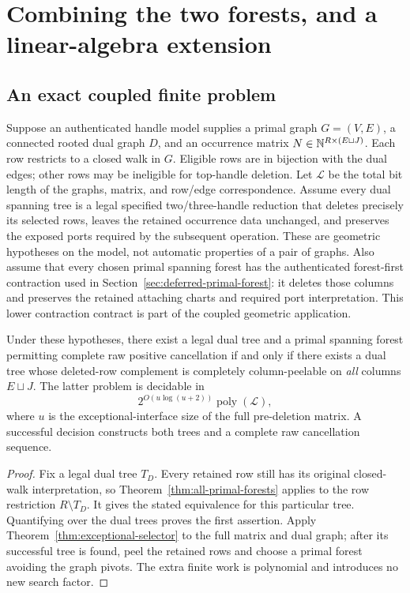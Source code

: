 \section{Combining the two forests, and a linear-algebra extension}
\label{sec:combination}

\subsection{An exact coupled finite problem}

Suppose an authenticated handle model supplies a primal graph $G=(V,E)$,
a connected rooted dual graph $D$, and an occurrence matrix
$N\in\mathbb N^{R\times(E\sqcup J)}$.  Each row restricts to a closed walk in
$G$.  Eligible rows are in bijection with the dual edges; other rows may
be ineligible for top-handle deletion.  Let $\mathcal L$ be the total bit
length of the graphs, matrix, and row/edge correspondence.
Assume every dual spanning tree is a legal specified
two/three-handle reduction that deletes precisely its selected rows,
leaves the retained occurrence data unchanged, and preserves the exposed
ports required by the subsequent operation.  These are geometric
hypotheses on the model, not automatic properties of a pair of graphs.
Also assume that every chosen primal spanning forest has the authenticated
forest-first contraction used in Section~\ref{sec:deferred-primal-forest}:
it deletes those columns and preserves the retained attaching charts and
required port interpretation.  This lower contraction contract is part
of the coupled geometric application.

\begin{corollary}
\label{cor:coupled-forests}
Under these hypotheses, there exist a legal dual tree and a primal
spanning forest permitting complete raw positive cancellation if and
only if there exists a dual tree whose deleted-row complement is
completely column-peelable on \emph{all} columns $E\sqcup J$.
The latter problem is decidable in
\[
 2^{O(u\log(u+2))}\operatorname{poly}(\mathcal L),
\]
where $u$ is the exceptional-interface size of the full pre-deletion
matrix.  A successful decision constructs both trees and a complete
raw cancellation sequence.
\end{corollary}
\begin{proof}
Fix a legal dual tree $T_D$.  Every retained row still has its original
closed-walk interpretation, so Theorem~\ref{thm:all-primal-forests} applies
to the row restriction $R\setminus T_D$.  It gives the stated equivalence
for this particular tree.  Quantifying over the dual trees proves the
first assertion.  Apply Theorem~\ref{thm:exceptional-selector} to the full
matrix and dual graph; after its successful tree is found, peel the
retained rows and choose a primal forest avoiding the graph pivots.
The extra finite work is polynomial and introduces no new search factor.
\end{proof}

